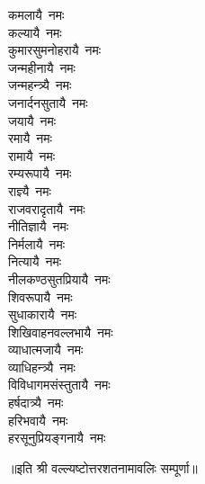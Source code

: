 \begin{flushleft}
\begin{multicols}{2}
कमलायै~नमः\\
कल्यायै~नमः\\
कुमारसुमनोहरायै~नमः\\
जन्महीनायै~नमः\\
जन्महन्त्र्यै~नमः\\
जनार्दनसुतायै~नमः\\
जयायै~नमः\hfill{}\\
रमायै~नमः\\
रामायै~नमः\\
रम्यरूपायै~नमः\\
राज्ञ्यै~नमः\\
राजवरादृतायै~नमः\\
नीतिज्ञायै~नमः\\
निर्मलायै~नमः\\
नित्यायै~नमः\\
नीलकण्ठसुतप्रियायै~नमः\\
शिवरूपायै~नमः\hfill{}\\
सुधाकारायै~नमः\\
शिखिवाहनवल्लभायै~नमः\\
व्याधात्मजायै~नमः\\
व्याधिहन्त्र्यै~नमः\\
विविधागमसंस्तुतायै~नमः\\
हर्षदात्र्यै~नमः\\
हरिभवायै~नमः\\
हरसूनुप्रियङ्गनायै~नमः\\
\end{multicols}
\end{flushleft}
॥इति श्री वल्ल्यष्टोत्तरशतनामावलिः सम्पूर्णा॥
